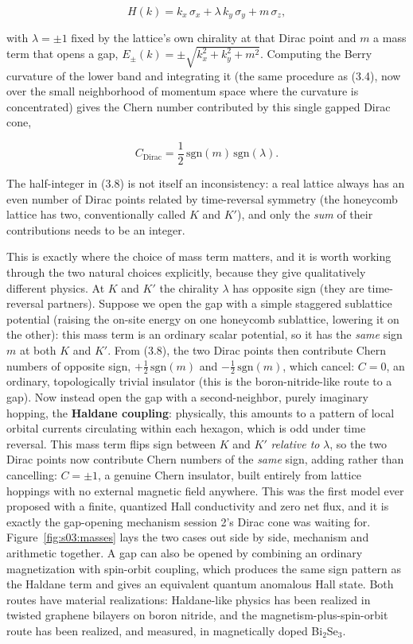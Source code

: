 \begin{equation}
H(k) = k_x\,\sigma_x + \lambda\, k_y\,\sigma_y + m\,\sigma_z,
\end{equation}

with $\lambda = \pm 1$ fixed by the lattice's own chirality at that Dirac point and $m$ a mass term
that opens a gap, $E_\pm(k) = \pm\sqrt{k_x^2+k_y^2+m^2}$. Computing the Berry curvature of the lower
band and integrating it (the same procedure as (3.4), now over the small neighborhood of momentum
space where the curvature is concentrated) gives the Chern number contributed by this single gapped
Dirac cone,

\begin{equation}
C_{\text{Dirac}} = \frac{1}{2}\,\mathrm{sgn}(m)\,\mathrm{sgn}(\lambda).
\end{equation}

The half-integer in (3.8) is not itself an inconsistency: a real lattice always has an even number of
Dirac points related by time-reversal symmetry (the honeycomb lattice has two, conventionally called
$K$ and $K'$), and only the \emph{sum} of their contributions needs to be an integer.

This is exactly where the choice of mass term matters, and it is worth working through the two
natural choices explicitly, because they give qualitatively different physics. At $K$ and $K'$ the
chirality $\lambda$ has opposite sign (they are time-reversal partners). Suppose we open the gap with
a simple staggered sublattice potential (raising the on-site energy on one honeycomb sublattice,
lowering it on the other): this mass term is an ordinary scalar potential, so it has the \emph{same} sign
$m$ at both $K$ and $K'$. From (3.8), the two Dirac points then contribute Chern numbers of opposite
sign, $+\tfrac12\,\mathrm{sgn}(m)$ and $-\tfrac12\,\mathrm{sgn}(m)$, which cancel: $C=0$, an ordinary,
topologically trivial insulator (this is the boron-nitride-like route to a gap). Now instead open the
gap with a second-neighbor, purely imaginary hopping, the \textbf{Haldane coupling}: physically, this
amounts to a pattern of local orbital currents circulating within each hexagon, which is odd under
time reversal. This mass term flips sign between $K$ and $K'$ \emph{relative to} $\lambda$, so the two
Dirac points now contribute Chern numbers of the \emph{same} sign, adding rather than cancelling:
$C = \pm 1$, a genuine Chern insulator, built entirely from lattice hoppings with no external magnetic
field anywhere. This was the first model ever proposed with a finite, quantized Hall conductivity and
zero net flux, and it is exactly the gap-opening mechanism session 2's Dirac cone was waiting for.
Figure~\ref{fig:s03:masses} lays the two cases out side by side, mechanism and arithmetic together. A
gap can also be opened by combining an ordinary magnetization with spin-orbit coupling, which produces
the same sign pattern as the Haldane term and gives an equivalent quantum anomalous Hall state.
Both routes have material realizations: Haldane-like physics has been realized in twisted graphene
bilayers on boron nitride, and the magnetism-plus-spin-orbit route has been realized, and measured, in
magnetically doped Bi$_2$Se$_3$.

